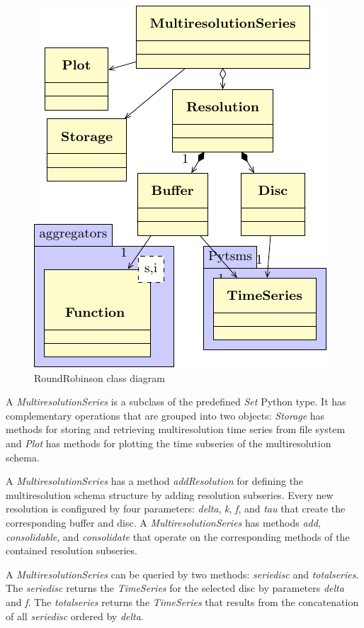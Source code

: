 \begin{figure}[tp]
  \centering
  \includegraphics{fig/fig_roundrobinson_uml}
  \caption{RoundRobinson  class diagram}
  \label{fig:implementacio:roundrobinson-uml}
\end{figure}



A \emph{MultiresolutionSeries} is a subclass of the predefined \emph{Set} Python
type. It has complementary operations that are grouped into two
objects: \emph{Storage} has methods for storing and retrieving
multiresolution time series from file system and \emph{Plot} has
methods for plotting the time subseries of the multiresolution schema.


A \emph{MultiresolutionSeries} has a method \emph{addResolution} for defining
the multiresolution schema structure by adding resolution
subseries. Every new resolution is configured by four parameters:
\emph{delta}, \emph{k}, \emph{f}, and \emph{tau} that create the
corresponding buffer and disc.  A \emph{MultiresolutionSeries} has methods
\emph{add}, \emph{consolidable}, and \emph{consolidate} that operate on
the corresponding methods of the contained resolution subseries.


A \emph{MultiresolutionSeries} can be queried by two methods:
\emph{seriedisc} and \emph{totalseries}. The \emph{seriedisc} returns
the \emph{TimeSeries} for the selected disc by parameters \emph{delta}
and \emph{f}. The \emph{totalseries} returns the \emph{TimeSeries}
that results from the concatenation of all \emph{seriedisc} ordered by
\emph{delta}.

